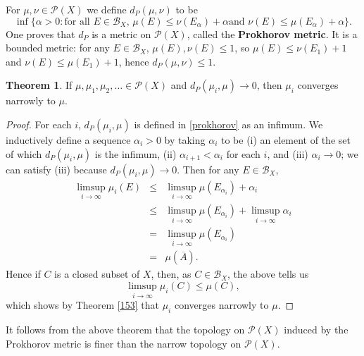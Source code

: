 \documentclass{article}
\theoremstyle{definition}
\newtheorem{theorem}{Theorem}
\theoremstyle{definition}
\begin{document}
For $\mu,\nu \in \mathscr{P}(X)$ we define $d_P(\mu,\nu)$ to be
\begin{equation}
\inf\{\alpha>0: \textrm{for all $E \in \mathscr{B}_X$, $\mu(E) \leq \nu(E_\alpha)+\alpha$
and $\nu(E) \leq \mu(E_\alpha)+\alpha$}\}.
\label{prokhorov}
\end{equation}
One proves that $d_P$ is a metric on $\mathscr{P}(X)$,  called the \textbf{Prokhorov metric}.
It is a bounded metric: for any $E \in \mathscr{B}_X$, $\mu(E),\nu(E) \leq 1$, so
$\mu(E) \leq \nu(E_1)+1$ and $\nu(E) \leq \mu(E_1)+1$, hence $d_P(\mu,\nu) \leq 1$. 




\begin{theorem}
If $\mu,\mu_1,\mu_2,\ldots \in\mathscr{P}(X)$ and $d_P(\mu_i,\mu) \to 0$, then $\mu_i$  converges narrowly
to $\mu$.
\end{theorem}
\begin{proof}
For each $i$, $d_P(\mu_i,\mu)$ is defined in \eqref{prokhorov} as an infimum. We inductively define
a sequence $\alpha_i>0$ by taking $\alpha_i$ to be (i)
an element of the set of which $d_P(\mu_i,\mu)$ is the infimum, (ii) 
$\alpha_{i+1}<\alpha_i$ for each $i$, and (iii) $\alpha_i \to 0$; we can satisfy (iii) because $d_P(\mu_i,\mu) \to 0$.
Then for any $E \in \mathscr{B}_X$,
\begin{eqnarray*}
\limsup_{i \to \infty} \mu_i(E)&\leq&\limsup_{i \to \infty} \mu(E_{\alpha_i})+\alpha_i\\
&\leq&\limsup_{i \to \infty} \mu(E_{\alpha_i}) + \limsup_{i \to \infty} \alpha_i\\
&=&\limsup_{i \to \infty} \mu(E_{\alpha_i})\\
&=&\mu(\overline{A}).
\end{eqnarray*}
Hence if $C$ is a closed subset of $X$, then, as $C \in \mathscr{B}_X$, the above tells us
\[
\limsup_{i \to \infty} \mu_i(C) \leq \mu(C),
\]
which shows by Theorem \ref{153} that $\mu_i$  converges narrowly to $\mu$.
\end{proof}

It follows from the above theorem that the topology on $\mathscr{P}(X)$ induced by the Prokhorov metric is finer than the narrow
topology on
$\mathscr{P}(X)$.
\end{document}

